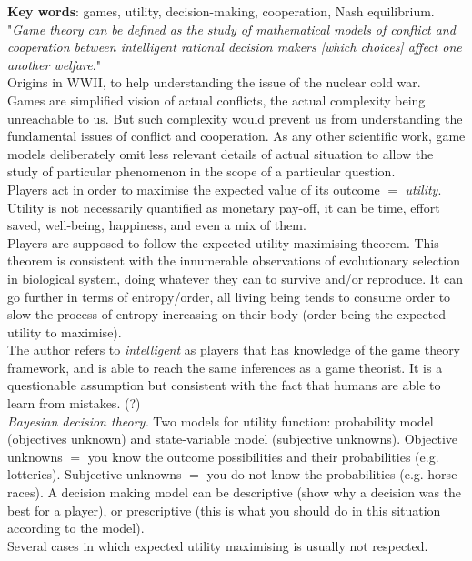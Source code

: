 \documentclass[12pt]{article}
\begin{document}
\textbf{Key words}: games, utility, decision-making, cooperation, Nash equilibrium.\\

"\textit{Game theory can be defined as the study of mathematical models of conflict and cooperation between intelligent rational decision makers [which choices] affect one another welfare}."\\
Origins in WWII, to help understanding the issue of the nuclear cold war.\\
Games are simplified vision of actual conflicts, the actual complexity being unreachable to us. But such complexity would prevent us from understanding the fundamental issues of conflict and cooperation. As any other scientific work, game models deliberately omit less relevant details of actual situation to allow the study of particular phenomenon in the scope of a particular question.\\
Players act in order to maximise the expected value of its outcome $=$ \textit{utility}. Utility is not necessarily quantified as monetary pay-off, it can be time, effort saved, well-being, happiness, and even a mix of them.\\
Players are supposed to follow the expected utility maximising theorem. This theorem is consistent with the innumerable observations of evolutionary selection in biological system, doing whatever they can to survive and/or reproduce. It can go further in terms of entropy/order, all living being tends to consume order to slow the process of entropy increasing on their body (order being the expected utility to maximise).\\
The author refers to \textit{intelligent} as players that has knowledge of the game theory framework, and is able to reach the same inferences as a game theorist. It is a questionable assumption but consistent with the fact that humans are able to learn from mistakes. (?)\\
\textit{Bayesian decision theory.} Two models for utility function: probability model (objectives unknown) and state-variable model (subjective unknowns). Objective unknowns $=$ you know the outcome possibilities and their probabilities (e.g. lotteries). Subjective unknowns $=$ you do not know the probabilities (e.g. horse races).
A decision making model can be descriptive (show why a decision was the best for a player), or prescriptive (this is what you should do in this situation according to the model).\\
Several cases in which expected utility maximising is usually not respected.
\end{document}
